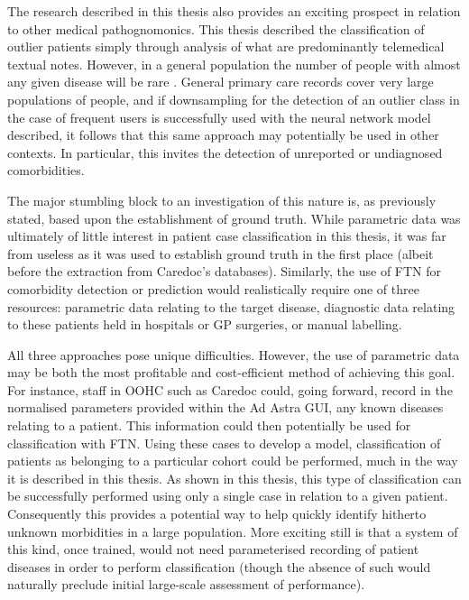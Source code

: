 The research described in this thesis also provides an exciting prospect in relation to other medical pathognomonics. This thesis described the classification of outlier patients simply through analysis of what are predominantly telemedical textual notes. However, in a general population the number of people with almost any given disease will be rare \cite{vos2016global}. General primary care records cover very large populations of people, and if downsampling for the detection of an outlier class in the case of frequent users is successfully used with the neural network model described, it follows that this same approach may potentially be used in other contexts. In particular, this invites the detection of unreported or undiagnosed comorbidities. 

The major stumbling block to an investigation of this nature is, as previously stated, based upon the establishment of ground truth. While parametric data was ultimately of little interest in patient case classification in this thesis, it was far from useless as it was used to establish ground truth in the first place (albeit before the extraction from Caredoc's databases). Similarly, the use of FTN for comorbidity detection or prediction would realistically require one of three resources: parametric data relating to the target disease, diagnostic data relating to these patients held in hospitals or GP surgeries, or manual labelling.

All three approaches pose unique difficulties. However, the use of parametric data may be both the most profitable and cost-efficient method of achieving this goal. For instance, staff in OOHC such as Caredoc could, going forward, record in the normalised parameters provided within the Ad Astra GUI, any known diseases relating to a patient. This information could then potentially be used for classification with FTN. Using these cases to develop a model, classification of patients as belonging to a particular cohort could be performed, much in the way it is described in this thesis. As shown in this thesis, this type of classification can be successfully performed using only a single case in relation to a given patient. Consequently this provides a potential way to help quickly identify hitherto unknown morbidities in a large population. More exciting still is that a system of this kind, once trained, would not need parameterised recording of patient diseases in order to perform classification (though the absence of such would naturally preclude initial large-scale assessment of performance). 

